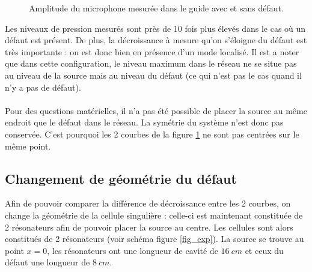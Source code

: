 \begin{figure}[!h]
\begin{minipage}[r]{1 \textwidth}
		\caption{Amplitude du microphone mesurée dans le guide avec et sans défaut.\label{p_tube}}
	\end{minipage}
\end{figure}

Les niveaux de pression mesurés sont près de 10 fois plus élevés dans le cas où un défaut est présent. De plus, la décroissance à mesure qu'on s'éloigne du défaut est très importante : on est donc bien en présence d'un mode localisé. Il est a noter que dans cette configuration, le niveau maximum dans le réseau ne se situe pas au niveau de la source mais au niveau du défaut (ce qui n'est pas le cas quand il n'y a pas de défaut).\\~\\


Pour des questions matérielles, il n'a pas été possible de placer la source au même endroit que le défaut dans le réseau. La symétrie du système n'est donc pas conservée. C'est pourquoi les 2 courbes de la figure \ref{p_tube} ne sont pas centrées sur le même point.

\subsection{Changement de géométrie du défaut}
Afin de pouvoir comparer la différence de décroissance entre les 2 courbes, on change la géométrie de la cellule singulière : celle-ci est maintenant constituée de 2 résonateurs afin de pouvoir placer la source au centre. Les cellules sont alors constitués de 2 résonateurs (voir schéma figure \ref{fig_exp}). La source se trouve au point $x=0$, les résonateurs ont une longueur de cavité de $16~cm$ et ceux du défaut une longueur de $8~cm$.


